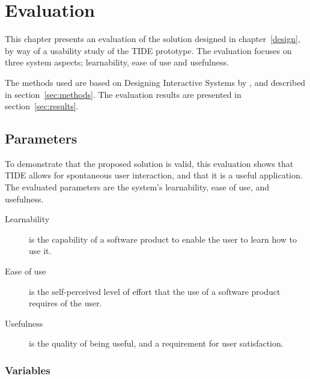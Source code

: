 

\chapter{Evaluation}
\label{evaluation}

This chapter presents an evaluation of the solution designed in chapter~\ref{design}, by way of a usability study of the TIDE prototype.
The evaluation focuses on three system aspects; learnability, ease of use and usefulness.

The methods used are based on Designing Interactive Systems by
\cite{Benyon:2010}, and described in section~\ref{sec:methods}.
The evaluation results are presented in section~\ref{sec:results}.

\section{Parameters}
\label{sec:parameters}

To demonstrate that the proposed solution is valid,
this evaluation shows that TIDE allows for spontaneous user interaction, and that it is a useful application.
The evaluated parameters are the system's learnability, ease of use, and usefulness.

\begin{description}
\item[Learnability] is the capability of a software product to enable the user to learn how to use it.

\item[Ease of use] is the self-perceived level of effort that the use of a software product requires of the user.

\item[Usefulness] is the quality of being useful, and a requirement for user satisfaction.

\end{description}

\subsection{Variables}

